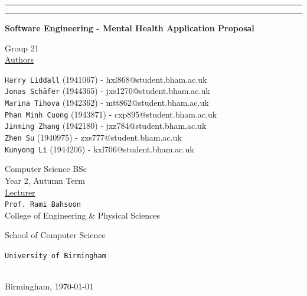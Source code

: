 \documentclass[a4paper,11pt]{article} %
\begin{document}
\thispagestyle{empty}
\begin{center}
    \rule{\textwidth}{0.5mm}\vspace{7mm}
    \Large{}\par
    \vspace{5mm}
    \rule{\textwidth}{0.5mm}\par
    \vspace{13mm}

    \large{\textbf{Software Engineering - Mental Health Application Proposal}}\par
    \vspace{5mm}
    \Large{Group 21}\\
    \vspace{5mm}
    \large
    \underline{Authors}\\
    \vspace{4mm}
    \normalsize

    \texttt{Harry Liddall} (1941067) - hxl868@student.bham.ac.uk\\
    \texttt{Jonas Schäfer} (1944365) - jxs1270@student.bham.ac.uk\\
    \texttt{Marina Tihova} (1942362) - mtt862@student.bham.ac.uk\\
    \texttt{Phan Minh Cuong} (1943871) - cxp895@student.bham.ac.uk\\
    \texttt{Jinming Zhang} (1942180) - jxz784@student.bham.ac.uk\\
    \texttt{Zhen Su} (1940975) - zxs777@student.bham.ac.uk\\
    \texttt{Kunyong Li} (1944206) - kxl706@student.bham.ac.uk\\
    \vspace{10mm}

    \large
    Computer Science BSc \\
    \vspace{1mm}
    Year 2, Autumn Term \\
    \vspace{5mm}
    \Large{\underline{Lecturer}}\\
    \vspace{2mm}
    \large
    \texttt{Prof. Rami Bahsoon}\\
    \vspace{10mm}
    College of Engineering \& Physical Sciences\par
    \vspace{3mm}
    School of Computer Science


    \vspace{15mm}

    \Large{\texttt{University of Birmingham}}\par
    \ \\
    \vspace{5mm}
    \normalsize
    Birmingham, \today\par
\end{center}
\end{document}
